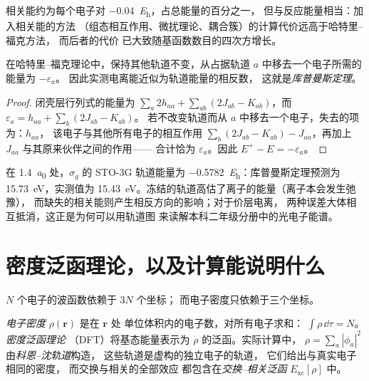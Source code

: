 相关能约为每个电子对 \qty{-0.04}{\hartree}，占总能量的百分之一，
但与反应能量相当：加入相关能的方法
（组态相互作用、微扰理论、耦合簇）的计算代价远高于哈特里–福克方法，
而后者的代价
已大致随基函数数目的四次方增长。

\begin{theorem}[库普曼斯定理]\label{thm:b3:computational-chemistry:koopmans}
在哈特里–福克理论中，保持其他轨道不变，从占据轨道
$a$ 中移去一个电子所需的能量为 $-\varepsilon_a$。
因此实测电离能近似为轨道能量的相反数，
这就是\emph{库普曼斯定理}。
\end{theorem}

\begin{proof}
闭壳层行列式的能量为 $\sum_a2h_{aa} + \sum_{ab}(2J_{ab} -
K_{ab})$，而 $\varepsilon_a = h_{aa} + \sum_b(2J_{ab} - K_{ab})$。
若不改变轨道而从 $a$ 中移去一个电子，失去的项为：$h_{aa}$，
该电子与其他所有电子的相互作用 $\sum_b(2J_{ab} - K_{ab}) -
J_{aa}$，再加上 $J_{aa}$ 与其原来伙伴之间的作用——
合计恰为 $\varepsilon_a$。因此 $E^+ - E = -\varepsilon_a$。
\end{proof}

\begin{example}[电离 \ce{H2}]\label{ex:b3:computational-chemistry:koopmans}
在 \qty{1.4}{\bohr} 处，$\sigma_g$ 的 STO-3G 轨道能量为
\qty{-0.5782}{\hartree}：库普曼斯定理预测为 \qty{15.73}{eV}，实测值为
\qty{15.43}{eV}。冻结的轨道高估了离子的能量（离子本会发生弛豫），
而缺失的相关能则产生相反方向的影响；对于价层电离，
两种误差大体相互抵消，这正是为何可以用轨道图
来读解本科二年级分册中的光电子能谱。
\end{example}

\section{密度泛函理论，以及计算能说明什么}

$N$ 个电子的波函数依赖于 $3N$ 个坐标；
而电子密度只依赖于三个坐标。

\begin{definition}\label{def:b3:computational-chemistry:dft}
\emph{电子密度} $\rho(\mathbf r)$ 是在 $\mathbf r$ 处
单位体积内的电子数，对所有电子求和：
$\int\rho\,\dd\tau = N$。\emph{密度泛函理论}
（DFT）将基态能量表示为 $\rho$ 的泛函。实际计算中，
$\rho = \sum_a|\phi_a|^2$ 由\emph{科恩–沈轨道}构造，
这些轨道是虚构的独立电子的轨道，
它们给出与真实电子相同的密度，
而交换与相关的全部效应
都包含在\emph{交换–相关泛函} $E_{\mathrm{xc}}[\rho]$ 中。
\end{definition}

